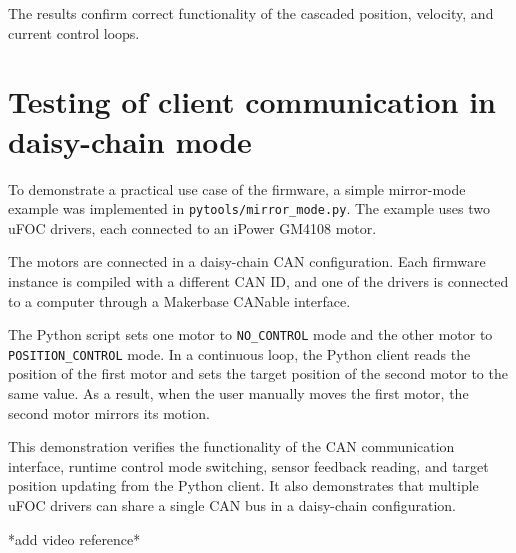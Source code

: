 The results confirm correct functionality of the cascaded position, velocity, and current control loops.

\section{Testing of client communication in daisy-chain mode}

To demonstrate a practical use case of the firmware, a simple mirror-mode example was implemented in \texttt{pytools/mirror\_mode.py}. 
The example uses two uFOC drivers, each connected to an iPower GM4108 motor.

The motors are connected in a daisy-chain CAN configuration. 
Each firmware instance is compiled with a different CAN ID, and one of the drivers is connected to a computer through a Makerbase CANable interface.

The Python script sets one motor to \texttt{NO\_CONTROL} mode and the other motor to \texttt{POSITION\_CONTROL} mode. 
In a continuous loop, the Python client reads the position of the first motor and sets the target position of the second motor to the same value. 
As a result, when the user manually moves the first motor, the second motor mirrors its motion.

This demonstration verifies the functionality of the CAN communication interface, runtime control mode switching, sensor feedback reading, 
and target position updating from the Python client. It also demonstrates that multiple uFOC drivers can share a single CAN bus in a daisy-chain configuration.

*add video reference*





